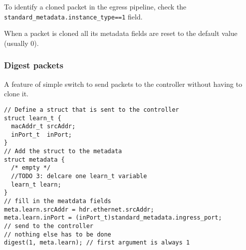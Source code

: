 \documentclass[a4paper, fontsize=8pt, landscape, DIV=1]{scrartcl}
\begin{document}
\begin{multicols*}{3}
  To identify a cloned packet in the egress pipeline, check the \texttt{standard\_metadata.instance\_type==1} field.

  When a packet is cloned all its metadata fields
  are reset to the default value (usually 0).


  \subsubsection{Digest packets}
  A feature of simple switch to send packets to the controller without having to clone it.

  \begin{lstlisting}[style=P4style]
// Define a struct that is sent to the controller
struct learn_t {
  macAddr_t srcAddr;
  inPort_t  inPort;
}
// Add the struct to the metadata
struct metadata {
  /* empty */
  //TODO 3: delcare one learn_t variable
  learn_t learn;
}
// fill in the meatdata fields
meta.learn.srcAddr = hdr.ethernet.srcAddr;
meta.learn.inPort = (inPort_t)standard_metadata.ingress_port;
// send to the controller
// nothing else has to be done
digest(1, meta.learn); // first argument is always 1\end{lstlisting}

  
\end{multicols*}

\setcounter{secnumdepth}{2}
\end{document}
